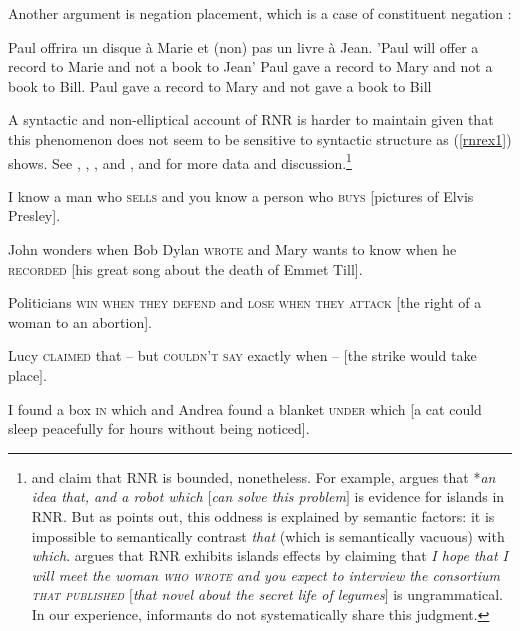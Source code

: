\documentclass[output=paper]{langsci/langscibook}
\begin{document}
\noindent
Another argument is negation placement, which is a case of constituent negation
\citep[253]{Mouret:06}: 

\begin{exe}
 \ex 
 \begin{xlista}
\ex Paul offrira un disque à Marie et (non) pas un livre à Jean.
'Paul will offer a record to Marie and not a book to Jean'
\ex Paul gave a record to Mary and not a book to Bill. 
\ex * Paul gave a record to Mary and not gave a book to Bill
\end{xlista}
\end{exe}


A syntactic and non-elliptical account of RNR is harder to maintain given that this phenomenon does not seem to be sensitive to  syntactic structure as (\ref{rnrex1}) shows. See 
\citet{bresnan74},
 \citet[299]{wexlercull},  \citet[45]{grosu81},
 and \citet{
mccawley},  and \citet[382,ft.30]{sab}
for more data and discussion.\footnote{\citet{
steedman85,gapsteed,steedmanbook}
and \citet[183]{dowty88} claim that
RNR is bounded, nonetheless.
For example, \citet{
dowty88} argues that  *\emph{an idea that, and a robot which $[$can solve this problem$]$} is  evidence for islands in RNR. But as \citet[95]{phil}
 points out, this oddness is explained by semantic factors: it is impossible to   semantically contrast \emph{that} (which is semantically vacuous) with \emph{which}.
 \citet[17]{steedmanbook}   argues that RNR
exhibits islands effects by claiming that \emph{I hope that I will meet the woman
\textsc{who wrote} and you expect to interview the
consortium \textsc{that published} $[$that
novel about the secret life of legumes$]$} is ungrammatical.
In our experience, informants do not systematically share this judgment.}


\begin{exe}
\ex
\begin{xlista}
\ex  I know a man who \textsc{sells} and you know a person who \textsc{buys}
                     [pictures of Elvis Presley].

\ex John wonders when Bob Dylan
\textsc{wrote} and Mary wants to know when
  he
\textsc{recorded} [his great song about the death of Emmet Till].
 
 \ex Politicians \textsc{win when they defend} and \textsc{lose when they attack}
[the right of a woman to an abortion].

\ex Lucy \textsc{claimed} that -- but \textsc{couldn't say}
exactly when --  $[$the strike would take place$]$.
 
 \ex I found a box \textsc{in} which and Andrea found a blanket \textsc{under}
which [a cat could sleep peacefully for hours without being
noticed].
\end{xlista}\label{rnrex1}
\end{exe}
\end{document}
